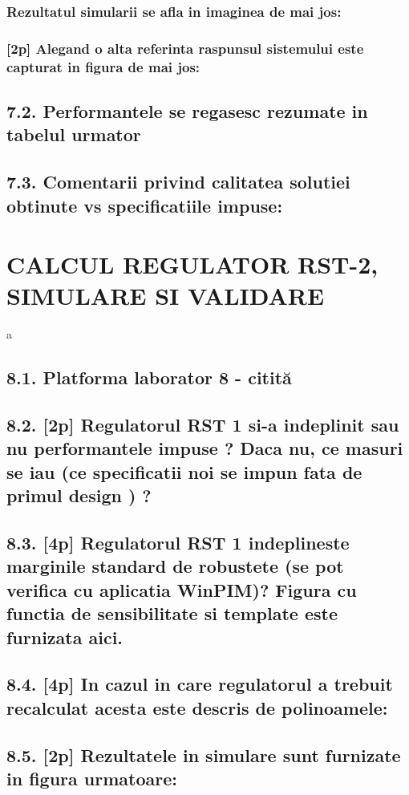 \documentclass[12pt,english]{article}
\begin{document}
\subsubsection {Rezultatul simularii se afla in imaginea de mai jos: }
\subsubsection {[2p] Alegand o alta referinta raspunsul sistemului este capturat in figura de mai jos: }
\subsection {7.2. Performantele se regasesc rezumate in tabelul urmator }
\subsection {7.3. Comentarii privind calitatea solutiei obtinute vs specificatiile impuse: }

\section {CALCUL REGULATOR RST-2, SIMULARE SI VALIDARE }
a
\subsection {8.1. Platforma laborator 8 - citită }
\subsection {8.2. [2p] Regulatorul RST 1 si-a indeplinit sau nu performantele impuse ?  Daca nu, ce masuri se iau (ce specificatii noi se impun fata de primul design ) ? }
\subsection {8.3. [4p] Regulatorul RST 1 indeplineste marginile standard de robustete (se pot verifica cu aplicatia WinPIM)?   Figura cu functia de sensibilitate si template este furnizata aici. }
\subsection {8.4. [4p] In cazul in care regulatorul a trebuit recalculat acesta este descris de polinoamele: }
\subsection {8.5. [2p] Rezultatele in simulare sunt furnizate in figura urmatoare: }
\end{document}
